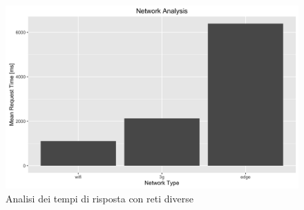 \begin{figure}[ht]
	\centering
	\includegraphics[width=\textwidth]{7-performance/Immagini/network_time_analysis.png}
	\caption{Analisi dei tempi di risposta con reti diverse}\label{fig:network-time-analysis}
\end{figure}